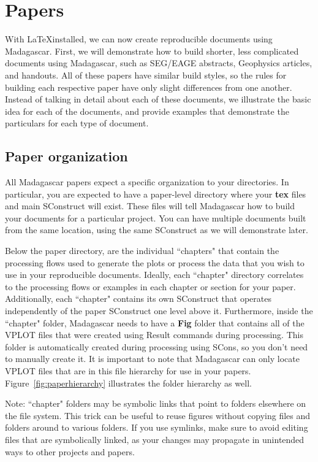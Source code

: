 \section{Papers}

With \LaTeX installed, we can now create reproducible documents using Madagascar.  First, we will demonstrate how to build shorter, less complicated documents using Madagascar, such as SEG/EAGE abstracts, Geophysics articles, and handouts.  All of these papers have similar build styles, so the rules for building each respective paper have only slight differences from one another.  Instead of talking in detail about each of these documents, we illustrate the basic idea for each of the documents, and provide examples that demonstrate the particulars for each type of document.  

\subsection{Paper organization}

All Madagascar papers expect a specific organization to your directories.  In particular, you are expected to have a paper-level directory where your \textbf{tex} files and main SConstruct will exist.  These files will tell Madagascar how to build your documents for a particular project.  You can have multiple documents built from the same location, using the same SConstruct as we will demonstrate later.  

Below the paper directory, are the individual ``chapters" that contain the processing flows used to generate the plots or process the data that you wish to use in your reproducible documents.  Ideally, each ``chapter" directory correlates to the processing flows or examples in each chapter or section for your paper.  Additionally, each ``chapter" contains its own SConstruct that operates independently of the paper SConstruct one level above it.  Furthermore, inside the ``chapter" folder, Madagascar needs to have a \textbf{Fig} folder that contains all of the VPLOT files that were created using Result commands during processing.    This folder is automatically created during processing using SCons, so you don't need to manually create it.  It is important to note that Madagascar can only locate VPLOT files that are in this file hierarchy for use in your papers.  Figure~\ref{fig:paperhierarchy} illustrates the folder hierarchy as well.

Note: ``chapter" folders may be symbolic links that point to folders elsewhere on the file system.  This trick can be useful to reuse figures without copying files and folders around to various folders.  If you use symlinks, make sure to avoid editing files that are symbolically linked, as your changes may propagate in unintended ways to other projects and papers.

